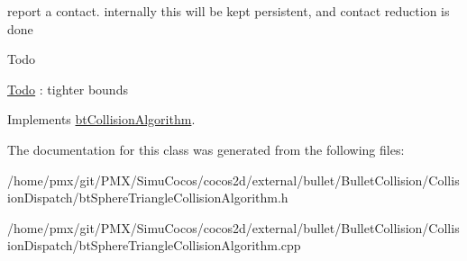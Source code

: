 report a contact. internally this will be kept persistent, and contact reduction is done

\begin{DoxyRefDesc}{Todo}
\item[\hyperlink{todo__todo000018}{Todo}]\+: tighter bounds \end{DoxyRefDesc}


Implements \hyperlink{classbtCollisionAlgorithm}{bt\+Collision\+Algorithm}.



The documentation for this class was generated from the following files\+:\begin{DoxyCompactItemize}
\item 
/home/pmx/git/\+P\+M\+X/\+Simu\+Cocos/cocos2d/external/bullet/\+Bullet\+Collision/\+Collision\+Dispatch/bt\+Sphere\+Triangle\+Collision\+Algorithm.\+h\item 
/home/pmx/git/\+P\+M\+X/\+Simu\+Cocos/cocos2d/external/bullet/\+Bullet\+Collision/\+Collision\+Dispatch/bt\+Sphere\+Triangle\+Collision\+Algorithm.\+cpp\end{DoxyCompactItemize}
